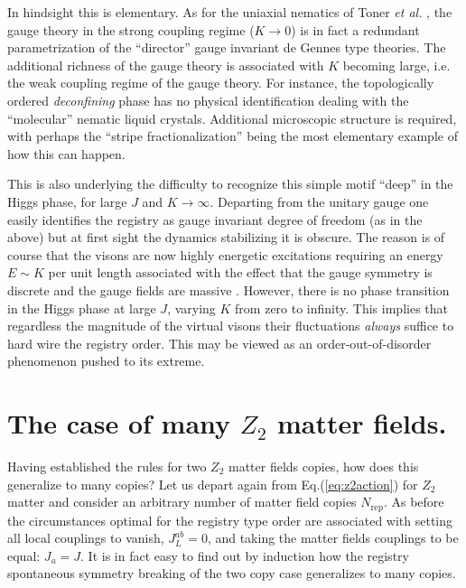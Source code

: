 In hindsight this is elementary. As for the uniaxial nematics of Toner {\em et al.} \cite{toner95}, the gauge theory in the strong coupling regime ($K \rightarrow 0$) is in fact a redundant parametrization of the ``director'' gauge invariant de Gennes type theories. The additional richness of the gauge theory is associated with $K$ becoming large, i.e. the weak coupling regime of the gauge theory. For instance, the topologically ordered {\em deconfining} phase has no physical identification dealing with the ``molecular'' nematic liquid crystals. Additional microscopic structure is required, with perhaps the ``stripe fractionalization'' \cite{stripefrac,stripefracdemler} being the most elementary example of how this can happen. 

This is also underlying the difficulty to recognize this simple  motif ``deep'' in the Higgs phase, for large $J$ and $K \rightarrow \infty$. Departing from the unitary gauge one easily identifies the registry as gauge invariant degree of freedom (as in the above) but at first sight the dynamics stabilizing it is obscure. The reason is of course that the visons are now highly energetic excitations  requiring an energy $E\sim K$ per unit length associated with the effect that the gauge symmetry is discrete and the gauge fields are massive . However, there is no phase transition in the Higgs phase at large $J$, varying $K$ from zero to infinity. This implies that regardless the magnitude of the virtual visons their fluctuations {\em always} suffice to hard wire the registry order. This may be viewed as an order-out-of-disorder phenomenon pushed to its extreme.  



\section{The case of many  $Z_2$ matter fields.}
\label{replmanyZ2}

Having established the rules for two $Z_2$ matter fields copies, how does this generalize to many copies? Let us depart again from Eq.(\ref{eq:z2action}) for $Z_2$ matter and consider an arbitrary number of matter field copies $N_{\text{rep}}$. As before the circumstances optimal for the registry type order are associated with setting all local couplings to vanish, $J_L^{ab} = 0$, and taking the matter fields couplings to be equal: $J_a = J$. It is in fact easy to find out by induction how the registry spontaneous symmetry breaking of the two copy case generalizes to many copies.




